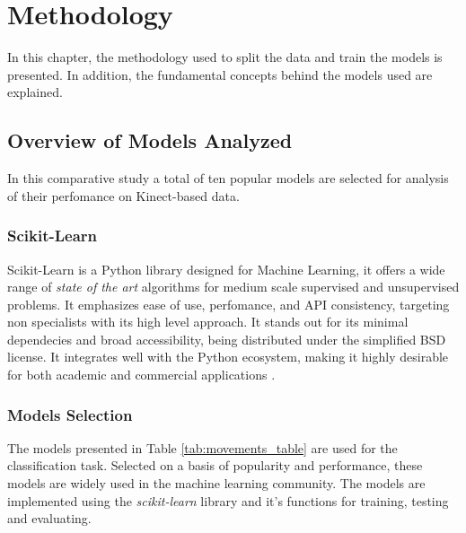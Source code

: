 %
%
\chapter{Methodology} \label{chap:methodology}
\hypersetup{colorlinks=true, linkcolor=red}
    In this chapter, the methodology used to split the data and train the models is presented. In addition, the fundamental concepts behind the models used are explained.
    \section{Overview of Models Analyzed}
        In this comparative study a total of ten popular models are selected for analysis of their perfomance on Kinect-based data.
        \subsection{Scikit-Learn}  

            Scikit-Learn is a Python library designed for Machine Learning, it offers a wide range of \textit{state of the art} algorithms for medium scale supervised and unsupervised problems. It emphasizes ease of use, perfomance, and API consistency, targeting non specialists with its high level approach. It stands out for its minimal dependecies and broad accessibility, being distributed under the simplified BSD license. It integrates well with the Python ecosystem, making it highly desirable for both academic and commercial applications \cite{scikit-learn}.

        \subsection{Models Selection}

        The models presented in Table \ref{tab:movements_table} are used for the classification task. Selected on a basis of popularity and performance, these models are widely used in the machine learning community. The models are implemented using the \textit{scikit-learn} library and it's functions for training, testing and evaluating\cite{sklearn_api}. 

